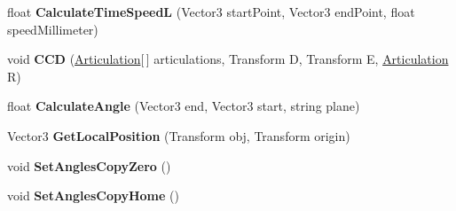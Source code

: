 \begin{DoxyCompactItemize}
float {\bfseries Calculate\+Time\+SpeedL} (Vector3 start\+Point, Vector3 end\+Point, float speed\+Millimeter)
\item 
\mbox{\label{class_i_k_a636e3f7944553bdc2b420d5906d719e6}} 
void {\bfseries C\+CD} (\mbox{\hyperlink{class_articulation}{Articulation}}\mbox{[}$\,$\mbox{]} articulations, Transform D, Transform E, \mbox{\hyperlink{class_articulation}{Articulation}} R)
\item 
\mbox{\label{class_i_k_a807e9ada54f7e21856b11ec1f288970e}} 
float {\bfseries Calculate\+Angle} (Vector3 end, Vector3 start, string plane)
\item 
\mbox{\label{class_i_k_a39c773afffbbc08a778a6a6ded4ebe9f}} 
Vector3 {\bfseries Get\+Local\+Position} (Transform obj, Transform origin)
\item 
\mbox{\label{class_i_k_a8b4370a0f1ee8b6b558c1f0b66997e01}} 
void {\bfseries Set\+Angles\+Copy\+Zero} ()
\item 
\mbox{\label{class_i_k_a37830992ab0d16482aa1cd55f7f0fa38}} 
void {\bfseries Set\+Angles\+Copy\+Home} ()
\end{DoxyCompactItemize}
